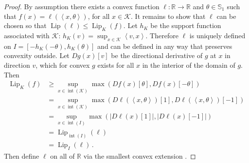 \documentclass[letter, 12pt]{report}
\newcommand{\R}{\mathbb R}
\newcommand{\ip}[1]{\left \langle #1 \right \rangle}
\newcommand{\sphere}{\mathbb{S}}
\newcommand{\cK}{\mathcal K}
\newcommand{\lip}{\operatorname{Lip}}
\newcommand{\interior}{\operatorname{int}}
\newcommand{\1}{\mathbf{1}}
\theoremstyle{plain}
\theoremstyle{definition}
\theoremstyle{remark}
\begin{document}
\begin{proof}
    By assumption there exists a convex function $\ell : \R \to \R$ and $\theta \in \sphere_1$ such that $f(x) = \ell(\ip{x, \theta})$, for all $x \in \cK$.
    It remains to show that $\ell$ can be chosen so that $\lip(\ell) \leq \lip_K(f)$.
    Let $h_K$ be the support function associated with $\cK$: $h_K(v) = \sup_{x \in \cK} \ip{v, x}$.
    Therefore $\ell$ is uniquely defined on $I = [-h_K(-\theta), h_K(\theta)]$ and can be defined in any way that preserves convexity outside.
    Let $Dg(x)[v]$ be the directional derivative of $g$ at $x$ in direction $v$, which for convex $g$ exists for all $x$ in the interior of the domain of $g$.
    Then
    \begin{align*}
        \lip_K(f)
         & \geq \sup_{x \in \interior(\cK)} \max(Df(x)[\theta], Df(x)[-\theta])                  \\
         & = \sup_{x \in \interior(\cK)} \max(D\ell(\ip{x,\theta})[1], D\ell(\ip{x,\theta})[-1]) \\
         & = \sup_{x \in \interior(I)} \max(|D\ell(x)[1]|, |D\ell(x)[-1]|)                       \\
         & = \lip_{\interior(I)}(\ell)                                                           \\
         & = \lip_I(\ell) \,.
    \end{align*}
    Then define $\ell$ on all of $\R$ via the smallest convex extension \citep[Proposition 3.18, for example]{lat24book}.
\end{proof}
\end{document}
